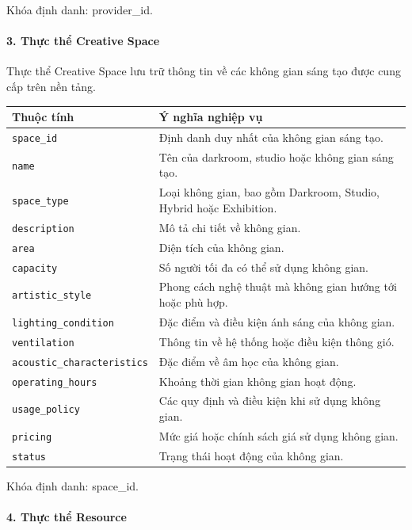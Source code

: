 Khóa định danh: provider\_id.

\paragraph{3. Thực thể Creative Space}\mbox{}\par

Thực thể Creative Space lưu trữ thông tin về các không gian sáng tạo được cung cấp trên nền tảng.

\begin{center}
\scriptsize
\begin{tabular}{p{.30\linewidth} p{.58\linewidth}}
\toprule
Thuộc tính & Ý nghĩa nghiệp vụ \\
\midrule
\texttt{space\_id} & Định danh duy nhất của không gian sáng tạo. \\
\texttt{name} & Tên của darkroom, studio hoặc không gian sáng tạo. \\
\texttt{space\_type} & Loại không gian, bao gồm Darkroom, Studio, Hybrid hoặc Exhibition. \\
\texttt{description} & Mô tả chi tiết về không gian. \\
\texttt{area} & Diện tích của không gian. \\
\texttt{capacity} & Số người tối đa có thể sử dụng không gian. \\
\texttt{artistic\_style} & Phong cách nghệ thuật mà không gian hướng tới hoặc phù hợp. \\
\texttt{lighting\_condition} & Đặc điểm và điều kiện ánh sáng của không gian. \\
\texttt{ventilation} & Thông tin về hệ thống hoặc điều kiện thông gió. \\
\texttt{acoustic\_characteristics} & Đặc điểm về âm học của không gian. \\
\texttt{operating\_hours} & Khoảng thời gian không gian hoạt động. \\
\texttt{usage\_policy} & Các quy định và điều kiện khi sử dụng không gian. \\
\texttt{pricing} & Mức giá hoặc chính sách giá sử dụng không gian. \\
\texttt{status} & Trạng thái hoạt động của không gian. \\
\bottomrule
\end{tabular}
\end{center}

Khóa định danh: space\_id.

\paragraph{4. Thực thể Resource}\mbox{}\par

